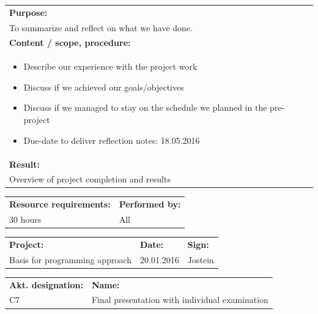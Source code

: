 \documentclass[12pt, a4paper]{article}
\begin{document}
\begin{tabularx}{\textwidth}{|X|}
	\textbf{Purpose:}\\
	 To summarize and reflect on what we have done.\\
	\hline
	\textbf{Content / scope, procedure:}\\
	\begin{itemize}
		\item Describe our experience with the project work
		\item Discuss if we achieved our goals/objectives
		\item Discuss if we managed to stay on the schedule we planned in the pre-project
		\item Due-date to deliver reflection notes: 18.05.2016

	\end{itemize}\\
 	\hline
	\textbf{Result:}\\
	Overview of project completion and results \\
	\hline
\end{tabularx}

\begin{tabularx}{\textwidth}{|X|p{30mm}|}
	\textbf{Resource requirements:}&\textbf{Performed by:}\\
	30 hours&All\\
	\hline
\end{tabularx}

\newpage

\begin{tabularx}{\textwidth}{|X|p{32mm}|p{20mm}|}
	\hline
	\textbf{Project:}&\textbf{Date:}&\textbf{Sign:}\\
	Basis for programming approach&20.01.2016&Jostein\\
	\hline
\end{tabularx}

\begin{tabularx}{\textwidth}{|p{40mm}|X|}
	\textbf{Akt. designation:}&\textbf{Name:}\\
	C7&Final presentation with individual examination  \\
	\hline
\end{tabularx}
\end{document}
